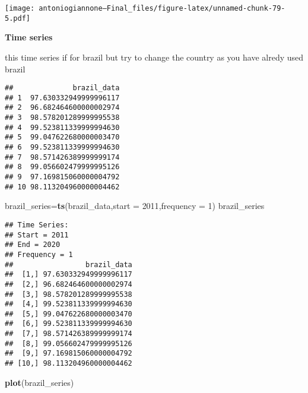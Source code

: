 \documentclass[
]{article}
\newenvironment{Shaded}{\begin{snugshade}}{\end{snugshade}}
\newcommand{\AttributeTok}[1]{\textcolor[rgb]{0.13,0.29,0.53}{#1}}
\newcommand{\DecValTok}[1]{\textcolor[rgb]{0.00,0.00,0.81}{#1}}
\newcommand{\FunctionTok}[1]{\textcolor[rgb]{0.13,0.29,0.53}{\textbf{#1}}}
\newcommand{\NormalTok}[1]{#1}
\newcommand{\OtherTok}[1]{\textcolor[rgb]{0.56,0.35,0.01}{#1}}
\newcommand{\SpecialCharTok}[1]{\textcolor[rgb]{0.81,0.36,0.00}{\textbf{#1}}}
\newcommand{\StringTok}[1]{\textcolor[rgb]{0.31,0.60,0.02}{#1}}
\begin{document}
\texttt{[image: antoniogiannone---Final\_files/figure-latex/unnamed-chunk-79-5.pdf]}

\textbf{Time series}

this time series if for brazil but try to change the country as you have
alredy used brazil

\begin{Shaded}
\end{Shaded}

\begin{verbatim}
##              brazil_data
## 1  97.630332949999996117
## 2  96.682464600000002974
## 3  98.578201289999995538
## 4  99.523811339999994630
## 5  99.047622680000003470
## 6  99.523811339999994630
## 7  98.571426389999999174
## 8  99.056602479999995126
## 9  97.169815060000004792
## 10 98.113204960000004462
\end{verbatim}

\begin{Shaded}
\begin{Highlighting}[]
\NormalTok{brazil\_series}\OtherTok{=}\FunctionTok{ts}\NormalTok{(brazil\_data,}\AttributeTok{start =} \DecValTok{2011}\NormalTok{,}\AttributeTok{frequency =} \DecValTok{1}\NormalTok{)}
\NormalTok{brazil\_series}
\end{Highlighting}
\end{Shaded}

\begin{verbatim}
## Time Series:
## Start = 2011 
## End = 2020 
## Frequency = 1 
##                 brazil_data
##  [1,] 97.630332949999996117
##  [2,] 96.682464600000002974
##  [3,] 98.578201289999995538
##  [4,] 99.523811339999994630
##  [5,] 99.047622680000003470
##  [6,] 99.523811339999994630
##  [7,] 98.571426389999999174
##  [8,] 99.056602479999995126
##  [9,] 97.169815060000004792
## [10,] 98.113204960000004462
\end{verbatim}

\begin{Shaded}
\begin{Highlighting}[]
\FunctionTok{plot}\NormalTok{(brazil\_series)}
\end{Highlighting}
\end{Shaded}
\end{document}
